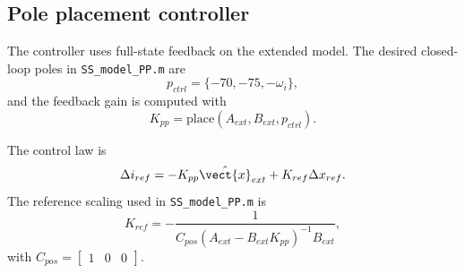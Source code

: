 \subsection{Pole placement controller}

The controller uses full-state feedback on the extended model. The desired closed-loop poles in \texttt{SS\_model\_PP.m} are
\begin{equation}
    p_{ctrl} = \{-70, -75, -\omega_i\},
\end{equation}
and the feedback gain is computed with
\begin{equation}
    K_{pp} = \mathrm{place}(A_{ext}, B_{ext}, p_{ctrl}).
\end{equation}

The control law is
\begin{equation}
    \Delta i_{ref} = -K_{pp} \hat{\vect{x}}_{ext} + K_{ref} \Delta x_{ref}.
\end{equation}
The reference scaling used in \texttt{SS\_model\_PP.m} is
\begin{equation}
    K_{ref} = -\frac{1}{C_{pos}\left(A_{ext} - B_{ext} K_{pp}\right)^{-1} B_{ext}},
\end{equation}
with $C_{pos} = \begin{bmatrix} 1 & 0 & 0 \end{bmatrix}$.

